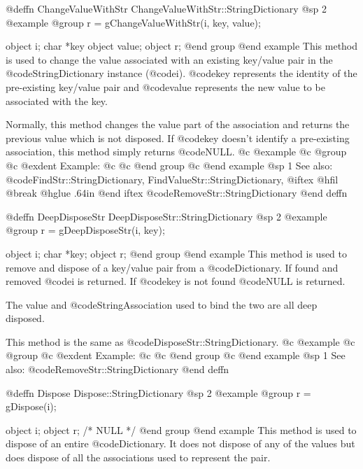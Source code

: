 @deffn {ChangeValueWithStr} ChangeValueWithStr::StringDictionary
@sp 2
@example
@group
r = gChangeValueWithStr(i, key, value);

object  i;
char    *key
object  value;
object  r;
@end group
@end example
This method is used to change the value associated with an existing
key/value pair in the @code{StringDictionary} instance (@code{i}).
@code{key} represents the identity of the pre-existing key/value
pair and @code{value} represents the new value to be associated with
the key.

Normally, this method changes the value part of the association
and returns the previous value which is not disposed.  If
@code{key} doesn't identify a pre-existing association, this method
simply returns @code{NULL}.
@c @example
@c @group
@c @exdent Example:
@c 
@c @end group
@c @end example
@sp 1
See also:  @code{FindStr::StringDictionary, FindValueStr::StringDictionary,}
@iftex
@hfil @break @hglue .64in      
@end iftex
@code{RemoveStr::StringDictionary}
@end deffn








@deffn {DeepDisposeStr} DeepDisposeStr::StringDictionary
@sp 2
@example
@group
r = gDeepDisposeStr(i, key);

object  i;
char    *key;
object  r;
@end group
@end example
This method is used to remove and dispose of a key/value pair from a
@code{Dictionary}.  If found and removed @code{i} is returned.  If @code{key}
is not found @code{NULL} is returned.

The value and @code{StringAssociation} used to bind the two are all deep
disposed.

This method is the same as @code{DisposeStr::StringDictionary}.
@c @example
@c @group
@c @exdent Example:
@c 
@c @end group
@c @end example
@sp 1
See also:  @code{RemoveStr::StringDictionary}
@end deffn













@deffn {Dispose} Dispose::StringDictionary
@sp 2
@example
@group
r = gDispose(i);

object  i;
object  r;     /*  NULL  */
@end group
@end example
This method is used to dispose of an entire @code{Dictionary}.  It does not
dispose of any of the values but does dispose of all the associations
used to represent the pair.  

